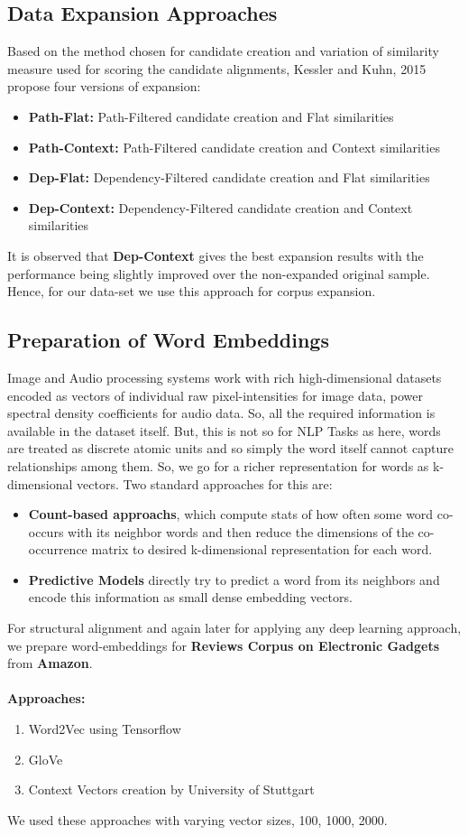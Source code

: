 \documentclass[12pt]{article}
\begin{document}
\subsection{Data Expansion Approaches}
Based on the method chosen for candidate creation and variation of similarity measure used for scoring the candidate alignments, Kessler and Kuhn, 2015  propose four versions of expansion:
\begin{itemize}
\item \textbf{Path-Flat:} Path-Filtered candidate creation and Flat similarities
\item \textbf{Path-Context:} Path-Filtered candidate creation and Context similarities
\item \textbf{Dep-Flat:} Dependency-Filtered candidate creation and Flat similarities
\item \textbf{Dep-Context:} Dependency-Filtered candidate creation and Context similarities
\end{itemize}
It is observed that \textbf{Dep-Context} gives the best expansion results with the performance being slightly improved over the non-expanded original sample. Hence, for our data-set we use this approach for corpus expansion.

\subsection{Preparation of Word Embeddings}
Image and Audio processing systems work with rich high-dimensional datasets encoded as vectors of individual raw pixel-intensities for image data, power spectral density coefficients for audio data. So, all the required information is available in the dataset itself. But, this is not so for NLP Tasks as here, words are treated as discrete atomic units and so simply the word itself cannot capture relationships among them. So, we go for a richer representation for words as k-dimensional vectors. Two standard approaches for this are:
\begin{itemize}
\item \textbf{Count-based approachs}, which compute stats of how often some word co-occurs with its neighbor words and then reduce the dimensions of the co-occurrence matrix to desired k-dimensional representation for each word.
\item \textbf{Predictive Models} directly try to predict a word from its neighbors and encode this information as small dense embedding vectors.
\end{itemize}
For structural alignment and again later for applying any deep learning approach, we prepare word-embeddings for \textbf{Reviews Corpus on Electronic Gadgets} from \textbf{Amazon}.\\\\
\textbf{Approaches:}
\begin{enumerate}
\item Word2Vec using Tensorflow
\item GloVe
\item Context Vectors creation by University of Stuttgart
\end{enumerate}
We used these approaches with varying vector sizes, 100, 1000, 2000.
\end{document}
